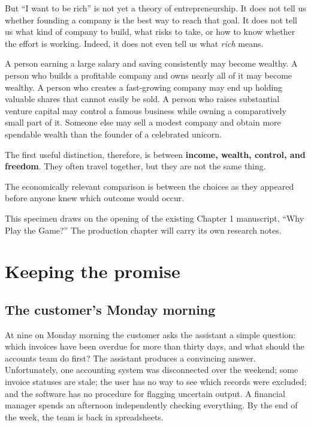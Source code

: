\documentclass[11pt,twoside,openright]{book}
\begin{document}
But “I want to be rich” is not yet a theory of entrepreneurship. It does not tell us whether founding a company is the best way to reach that goal. It does not tell us what kind of company to build, what risks to take, or how to know whether the effort is working. Indeed, it does not even tell us what \emph{rich} means.

A person earning a large salary and saving consistently may become wealthy. A person who builds a profitable company and owns nearly all of it may become wealthy. A person who creates a fast-growing company may end up holding valuable shares that cannot easily be sold. A person who raises substantial venture capital may control a famous business while owning a comparatively small part of it. Someone else may sell a modest company and obtain more spendable wealth than the founder of a celebrated unicorn.

The first useful distinction, therefore, is between \textbf{income, wealth, control, and freedom}. They often travel together, but they are not the same thing.

\begin{KeyIdea}
The economically relevant comparison is between the choices as they appeared
before anyone knew which outcome would occur.
\end{KeyIdea}
\NotesSection
This specimen draws on the opening of the existing Chapter 1 manuscript,
``Why Play the Game?'' The production chapter will carry its own research notes.
\chapter{Keeping the promise}
\begin{LessonBrief}
\end{LessonBrief}
\section{The customer's Monday morning}
At nine on Monday morning the customer asks the assistant a simple question: which invoices have been overdue for more than thirty days, and what should the accounts team do first? The assistant produces a convincing answer. Unfortunately, one accounting system was disconnected over the weekend; some invoice statuses are stale; the user has no way to see which records were excluded; and the software has no procedure for flagging uncertain output. A financial manager spends an afternoon independently checking everything. By the end of the week, the team is back in spreadsheets.
\end{document}
